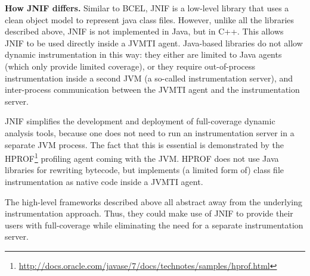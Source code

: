 \textbf{How JNIF differs.}
Similar to BCEL, JNIF is a low-level library that uses a clean object model to represent java class files.
However, unlike all the libraries described above,
JNIF is not implemented in Java, but in C++.
This allows JNIF to be used directly inside a JVMTI agent. 
Java-based libraries do not allow dynamic instrumentation in this way:
they either are limited to Java agents (which only provide limited coverage),
or they require out-of-process instrumentation inside a second JVM (a so-called instrumentation server),
and inter-process communication between the JVMTI agent and the instrumentation server.

JNIF simplifies the development and deployment of full-coverage dynamic analysis tools,
because one does not need to run an instrumentation server in a separate JVM process.
The fact that this is essential is demonstrated by the HPROF\footnote{\url{http://docs.oracle.com/javase/7/docs/technotes/samples/hprof.html}} profiling agent coming with the JVM.
HPROF does not use Java libraries for rewriting bytecode,
but implements (a limited form of) class file instrumentation as native code inside a JVMTI agent.

The high-level frameworks described above all abstract away from the underlying instrumentation approach.
Thus, they could make use of JNIF to provide their users with full-coverage 
while eliminating the need for a separate instrumentation server.


